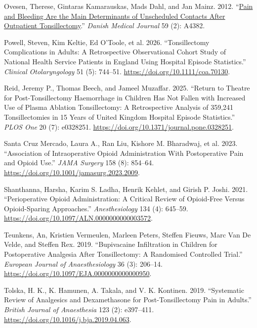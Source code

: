 \documentclass[
  letterpaper,
  DIV=11,
  numbers=noendperiod]{scrreprt}
\newlength{\cslhangindent}
\newenvironment{CSLReferences}[2] %
 {\begin{list}{}{%
  \setlength{\itemindent}{0pt}
  \setlength{\leftmargin}{0pt}
  \setlength{\parsep}{0pt}
  \ifodd #1
   \setlength{\leftmargin}{\cslhangindent}
   \setlength{\itemindent}{-1\cslhangindent}
  \fi
  \setlength{\itemsep}{#2\baselineskip}}}
 {\end{list}}
\begin{document}
\begin{CSLReferences}{1}{1}
Ovesen, Therese, Gintaras Kamarauskas, Mads Dahl, and Jan Mainz. 2012.
{``\href{https://www.ncbi.nlm.nih.gov/pubmed/22293052}{Pain and Bleeding
Are the Main Determinants of Unscheduled Contacts After Outpatient
Tonsillectomy}.''} \emph{Danish Medical Journal} 59 (2): A4382.

Powell, Steven, Kim Keltie, Ed O'Toole, et al. 2026. {``Tonsillectomy
{Complications} in {Adults}: {A Retrospective Observational Cohort
Study} of {National Health Service Patients} in {England Using Hospital
Episode Statistics}.''} \emph{Clinical Otolaryngology} 51 (5): 744--51.
\url{https://doi.org/10.1111/coa.70130}.

Reid, Jeremy P., Thomas Beech, and Jameel Muzaffar. 2025. {``Return to
Theatre for Post-Tonsillectomy Haemorrhage in Children Has Not Fallen
with Increased Use of Plasma Ablation Tonsillectomy: A Retrospective
Analysis of 359,241 Tonsillectomies in 15 Years of {United Kingdom
Hospital Episode Statistics}.''} \emph{PLOS One} 20 (7): e0328251.
\url{https://doi.org/10.1371/journal.pone.0328251}.

Santa Cruz Mercado, Laura A., Ran Liu, Kishore M. Bharadwaj, et al.
2023. {``Association of {Intraoperative Opioid Administration With
Postoperative Pain} and {Opioid Use}.''} \emph{JAMA Surgery} 158 (8):
854--64. \url{https://doi.org/10.1001/jamasurg.2023.2009}.

Shanthanna, Harsha, Karim S. Ladha, Henrik Kehlet, and Girish P. Joshi.
2021. {``Perioperative {Opioid Administration}: {A Critical Review} of
{Opioid}-Free Versus {Opioid}-Sparing {Approaches}.''}
\emph{Anesthesiology} 134 (4): 645--59.
\url{https://doi.org/10.1097/ALN.0000000000003572}.

Teunkens, An, Kristien Vermeulen, Marleen Peters, Steffen Fieuws, Marc
Van De Velde, and Steffen Rex. 2019. {``Bupivacaine Infiltration in
Children for Postoperative Analgesia After Tonsillectomy: {A} Randomised
Controlled Trial.''} \emph{European Journal of Anaesthesiology} 36 (3):
206--14. \url{https://doi.org/10.1097/EJA.0000000000000950}.

Tolska, H. K., K. Hamunen, A. Takala, and V. K. Kontinen. 2019.
{``Systematic Review of Analgesics and Dexamethasone for
Post-Tonsillectomy Pain in Adults.''} \emph{British Journal of
Anaesthesia} 123 (2): e397--411.
\url{https://doi.org/10.1016/j.bja.2019.04.063}.

\end{CSLReferences}
\end{document}
